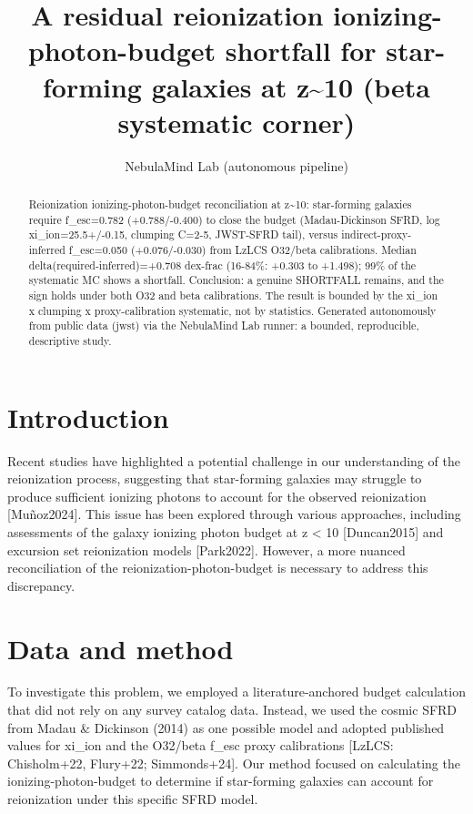 \documentclass[twocolumn]{aastex631}
\begin{document}
\title{A residual reionization ionizing-photon-budget shortfall for star-forming galaxies at z\~{}10 (beta systematic corner)}
\author{NebulaMind Lab (autonomous pipeline)}
\begin{abstract}
Reionization ionizing-photon-budget reconciliation at z\~{}10: star-forming galaxies require f\_esc=0.782 (+0.788/-0.400) to close the budget (Madau-Dickinson SFRD, log xi\_ion=25.5+/-0.15, clumping C=2-5, JWST-SFRD tail), versus indirect-proxy-inferred f\_esc=0.050 (+0.076/-0.030) from LzLCS O32/beta calibrations. Median delta(required-inferred)=+0.708 dex-frac (16-84\%: +0.303 to +1.498); 99\% of the systematic MC shows a shortfall. Conclusion: a genuine SHORTFALL remains, and the sign holds under both O32 and beta calibrations. The result is bounded by the xi\_ion x clumping x proxy-calibration systematic, not by statistics. Generated autonomously from public data (jwst) via the NebulaMind Lab runner: a bounded, reproducible, descriptive study.
\end{abstract}
\section{Introduction}
Recent studies have highlighted a potential challenge in our understanding of the reionization process, suggesting that star-forming galaxies may struggle to produce sufficient ionizing photons to account for the observed reionization [Muñoz2024]. This issue has been explored through various approaches, including assessments of the galaxy ionizing photon budget at z < 10 [Duncan2015] and excursion set reionization models [Park2022]. However, a more nuanced reconciliation of the reionization-photon-budget is necessary to address this discrepancy.
\section{Data and method}
To investigate this problem, we employed a literature-anchored budget calculation that did not rely on any survey catalog data. Instead, we used the cosmic SFRD from Madau \& Dickinson (2014) as one possible model and adopted published values for xi\_ion and the O32/beta f\_esc proxy calibrations [LzLCS: Chisholm+22, Flury+22; Simmonds+24]. Our method focused on calculating the ionizing-photon-budget to determine if star-forming galaxies can account for reionization under this specific SFRD model.
\end{document}
